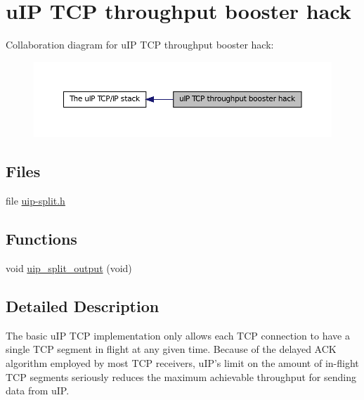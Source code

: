 \hypertarget{group__uipsplit}{
\section{uIP TCP throughput booster hack}
\label{group__uipsplit}
}


Collaboration diagram for uIP TCP throughput booster hack:
\nopagebreak
\begin{figure}[H]
\begin{center}
\leavevmode
\includegraphics[width=400pt]{group__uipsplit}
\end{center}
\end{figure}


\subsection*{Files}
\begin{DoxyCompactItemize}
\item 
file \hyperlink{uip-split_8h}{uip-\/split.h}
\end{DoxyCompactItemize}
\subsection*{Functions}
\begin{DoxyCompactItemize}
\item 
void \hyperlink{group__uipsplit_gab4b17aaf20d630f30919b19937b966a3}{uip\_\-split\_\-output} (void)
\end{DoxyCompactItemize}


\subsection{Detailed Description}
The basic uIP TCP implementation only allows each TCP connection to have a single TCP segment in flight at any given time. Because of the delayed ACK algorithm employed by most TCP receivers, uIP's limit on the amount of in-\/flight TCP segments seriously reduces the maximum achievable throughput for sending data from uIP.

